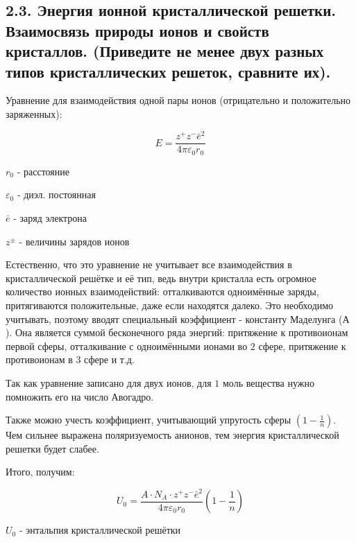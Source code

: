 
\subsection{2.3. Энергия ионной кристаллической решетки. Взаимосвязь природы ионов и свойств кристаллов. (Приведите не менее двух разных типов кристаллических решеток, сравните их).} 

\par\bigskip
	
Уравнение для взаимодействия одной пары ионов (отрицательно и
положительно заряженных):

$$E=\frac{z^+z^-\bar{e}^2}{4\pi\varepsilon_0r_0}$$

\begin{center}
$r_0$ - расстояние
\par\smallskip
$\varepsilon_0$ - диэл. постоянная
\par\smallskip
$\bar{e}$ - заряд электрона
\par\smallskip
$z^\pm$ - величины зарядов ионов
\end{center}

Естественно, что это уравнение не учитывает все взаимодействия в
кристаллической решётке и её тип, ведь внутри кристалла есть
огромное количество ионных взаимодействий: отталкиваются
одноимённые заряды, притягиваются положительные, даже если
находятся далеко. Это необходимо учитывать, поэтому вводят
специальный коэффициент - константу Маделунга ($А$). Она
является суммой бесконечного ряда энергий: притяжение к
противоионам первой сферы, отталкивание с одноимёнными
ионами во $2$ сфере, притяжение к противоионам в $3$ сфере и т.д.

\par\smallskip

Так как уравнение записано для двух ионов, для $1$ моль вещества
нужно помножить его на число Авогадро.

\par\smallskip

Также можно учесть коэффициент, учитывающий упругость сферы
$(1-\frac{1}{n})$. Чем сильнее выражена поляризуемость анионов, тем
энергия кристаллической решетки будет слабее.

\par\smallskip

Итого, получим:

$$ U_0 = \frac{A\cdot N_A\cdot z^+ z^- \bar{e}^2}{4\pi \varepsilon_0 r_0} \left(1- \frac{1}{n} \right) $$

\begin{center}
$U_0$ - энтальпия кристаллической решётки
\end{center}

